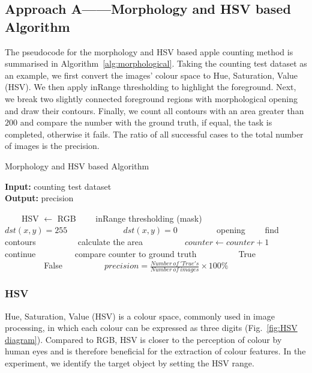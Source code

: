 \subsection{Approach A——Morphology and HSV based Algorithm}
The pseudocode for the morphology and HSV based apple counting method is summarised in Algorithm~\ref{alg:morphological}. Taking the counting test dataset as an example, we first convert the images' colour space to Hue, Saturation, Value (HSV). We then apply inRange thresholding to highlight the foreground. Next, we break two slightly connected foreground regions with morphological opening and draw their contours. Finally, we count all contours with an area greater than $200$ and compare the number with the ground truth, if equal, the task is completed, otherwise it fails. The ratio of all successful cases to the total number of images is the precision. 

\begin{algorithm}[htb]
\label{alg:morphological}
\caption{Morphology and HSV based Algorithm} %
\hspace*{0.02in} {\bf Input:} counting test dataset\\%
\hspace*{0.02in} {\bf Output:} precision %
\begin{algorithmic}[1]

　　\State HSV $\gets$ RGB
　　\State inRange thresholding (mask)
　　　　\State $dst(x, y) = 255$
　　\Else
　　　　\State $dst(x, y) = 0$
　　\EndIf
　　\State opening
　　\State find contours
　　    \State calculate the area 
　　        \State $counter \gets counter + 1$
　　    \Else
　　        \State continue
　　    \EndIf
　　\State compare counter to ground truth
　　    \State True
　　\Else
　　    \State False
　　\EndIf
　　\EndFor
\EndFor
\State \Return $precision = \frac{Number\ of\ 'True's}{Number\ of\ images}\times 100\%$
\end{algorithmic}
\end{algorithm}


\subsubsection{HSV}
Hue, Saturation, Value (HSV) is a colour space, commonly used in image processing, in which each colour can be expressed as three digits (Fig.~\ref{fig:HSV diagram}). Compared to RGB, HSV is closer to the perception of colour by human eyes and is therefore beneficial for the extraction of colour features. In the experiment, we identify the target object by setting the HSV range.

